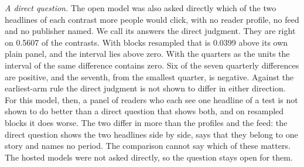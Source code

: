 \emph{A direct question.} The open model was also asked directly which of the two headlines of each contrast more people would click, with no reader profile, no feed and no publisher named. We call its answers the direct judgment. They are right on 0.5607 of the contrasts. With blocks resampled that is 0.0399 above its own plain panel, and the interval lies above zero. With the quarters as the units the interval of the same difference contains zero. Six of the seven quarterly differences are positive, and the seventh, from the smallest quarter, is negative. Against the earliest-arm rule the direct judgment is not shown to differ in either direction. For this model, then, a panel of readers who each see one headline of a test is not shown to do better than a direct question that shows both, and on resampled blocks it does worse. The two differ in more than the profiles and the feed: the direct question shows the two headlines side by side, says that they belong to one story and names no period. The comparison cannot say which of these matters. The hosted models were not asked directly, so the question stays open for them.

